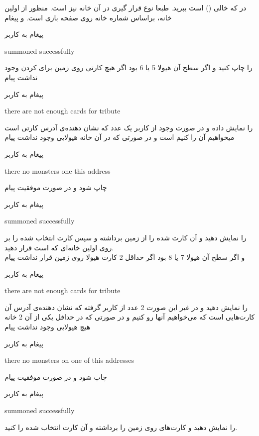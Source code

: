 \documentclass[]{article}
\begin{document}
در 
 که خالی () است ببرید. طبعا نوع قرار گیری در 
آن خانه نیز  است. منظور از اولین خانه، براساس شماره خانه روی صفحه 
بازی است. و پیغام 
\begin{mybox}[colback=yellow]{پیغام به کاربر}
	\begin{latin}	
		summoned successfully
	\end{latin}
\end{mybox}
را چاپ کنید و اگر سطح آن هیولا 5 یا 6 بود اگر هیچ کارتی روی زمین برای 
 کردن وجود نداشت پیام
\begin{mybox}[colback=yellow]{پیغام به کاربر}
	\begin{latin}	
		there are not enough cards for tribute
	\end{latin}
\end{mybox}
را نمایش داده و در صورت وجود از کاربر یک عدد که نشان دهنده‌ی آدرس کارتی است 
میخواهیم آن را  کنیم است و در صورتی که در آن خانه هیولایی وجود 
نداشت پیام
\begin{mybox}[colback=yellow]{پیغام به کاربر}
	\begin{latin}	
		there no monsters one this address		
	\end{latin}
\end{mybox}
چاپ شود و در صورت موفقیت پیام
\begin{mybox}[colback=yellow]{پیغام به کاربر}
	\begin{latin}	
		summoned successfully 
	\end{latin}
\end{mybox}
را نمایش دهید و آن کارت  شده را از زمین برداشته و سپس کارت 
انتخاب شده را بر روی اولین خانه‌ای که  است قرار دهید.
\\
و اگر سطح آن هیولا 7 یا 8 بود اگر حداقل 2 کارت هیولا روی زمین قرار نداشت پیام
\begin{mybox}[colback=yellow]{پیغام به کاربر}
	\begin{latin}	
		there are not enough cards for tribute
	\end{latin}
\end{mybox}
را نمایش دهید و در غیر این صورت 2 عدد از کاربر گرفته که نشان دهنده‌ی آدرس آن 
کارت‌هایی است که می‌خواهیم آنها رو  کنیم و در صورتی که در حداقل 
یکی از آن 2 خانه هیچ هیولایی وجود نداشت پیام
\begin{mybox}[colback=yellow]{پیغام به کاربر}
	\begin{latin}	
		there no monsters on one of this addresses
	\end{latin}
\end{mybox}
چاپ شود و در صورت موفقیت پیام
\begin{mybox}[colback=yellow]{پیغام به کاربر}
	\begin{latin}	
		summoned successfully
	\end{latin}
\end{mybox}
را نمایش دهید و کارت‌های روی زمین را برداشته و آن کارت انتخاب شده را 
 کنید.
\end{document}
